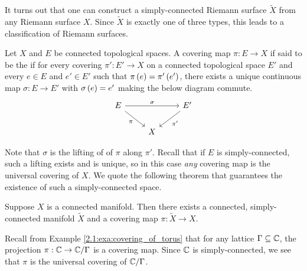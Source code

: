 \documentclass[../Moduli_Spaces_of_Riemann_Surfaces.tex]{subfiles}
\begin{document}
    \begin{remark}
        It turns out that one can construct a simply-connected Riemann surface $\tilde{X}$ from any Riemann surface $X$. Since $\tilde{X}$ is exactly one of three types, this leads to a classification of Riemann surfaces.\exqed
    \end{remark}
    \begin{definition}
        Let $X$ and $E$ be connected topological spaces. A covering map $\pi:E\to X$ if said to be the  if for every covering $\pi':E'\to X$ on a connected topological space $E'$ and every $e\in E$ and $e'\in E'$ such that $\pi\left(e\right)=\pi'\left(e'\right)$, there exists a unique continuous map $\sigma:E\to E'$ with $\sigma\left(e\right)=e'$ making the below diagram commute.
        \begin{equation*}
            \begin{tikzcd}
                E \ar[rr, "\sigma"] \ar[dr, "\pi"'] & & E' \ar[dl, "\pi'"] \\
                                                    & X
            \end{tikzcd}
        \end{equation*}
    \end{definition}
    \vspace{-0.05in}
    \begin{remark}
        Note that $\sigma$ is the lifting of of $\pi$ along $\pi'$. Recall that if $E$ is simply-connected, such a lifting exists and is unique, so in this case \textit{any} covering map is the universal covering of $X$. We quote the following theorem that guarantees the existence of such a simply-connected space.\exqed
    \end{remark}
    \begin{theorem}
        Suppose $X$ is a connected manifold. Then there exists a connected, simply-connected manifold $\tilde{X}$ and a covering map $\pi:\tilde{X}\to X$.
    \end{theorem}
    \begin{example}
        Recall from Example \ref{2.1:exa:covering_of_torus} that for any lattice $\Gamma\subseteq\mathbb{C}$, the projection $\pi:\mathbb{C}\to\mathbb{C}/\Gamma$ is a covering map. Since $\mathbb{C}$ is simply-connected, we see that $\pi$ is the universal covering of $\mathbb{C}/\Gamma$.\exqed
    \end{example}
\end{document}

